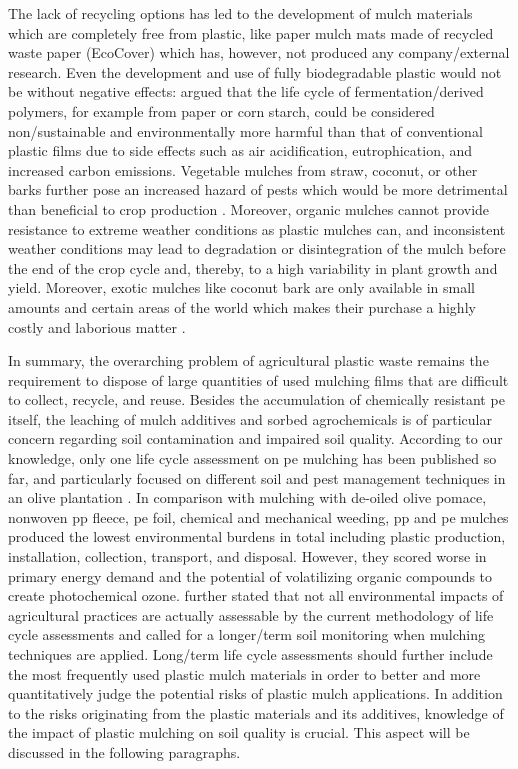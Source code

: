 The lack of recycling options has led to the development of mulch materials which are completely free from plastic, like paper mulch mats made of recycled waste paper (EcoCover) which has, however, not produced any company\-/external research. Even the development and use of fully biodegradable plastic would not be without negative effects: \citet{GerngrossCan1999} argued that the life cycle of fermentation\-/derived polymers, for example from paper or corn starch, could be considered non\-/sustainable and environmentally more harmful than that of conventional plastic films due to side effects such as air acidification, eutrophication, and increased carbon emissions. Vegetable mulches from straw, coconut, or other barks further pose an increased hazard of pests which would be more detrimental than beneficial to crop production \citep{HowardOrganic1998}. Moreover, organic mulches cannot provide resistance to extreme weather conditions as plastic mulches can, and inconsistent weather conditions may lead to degradation or disintegration of the mulch before the end of the crop cycle and, thereby, to a high variability in plant growth and yield. Moreover, exotic mulches like coconut bark are only available in small amounts and certain areas of the world which makes their purchase a highly costly and laborious matter \citep{BriassoulisDegradation2015}.

In summary, the overarching problem of agricultural plastic waste remains the requirement to dispose of large quantities of used mulching films that are difficult to collect, recycle, and reuse. Besides the accumulation of chemically resistant \ac{pe} itself, the leaching of mulch additives and sorbed agrochemicals is of particular concern regarding soil contamination and impaired soil quality. According to our knowledge, only one life cycle assessment on \ac{pe} mulching has been published so far, and particularly focused on different soil and pest management techniques in an olive plantation \citep{RussoEnvironmental2015}.
In comparison with mulching with de-oiled olive pomace, nonwoven \ac{pp} fleece, \ac{pe} foil, chemical and mechanical weeding, \ac{pp} and \ac{pe} mulches produced the lowest environmental burdens in total including plastic production, installation, collection, transport, and disposal. However, they scored worse in primary energy demand and the potential of volatilizing organic compounds to create photochemical ozone.  further stated that not all environmental impacts of agricultural practices are actually assessable by the current methodology of life cycle assessments and called for a longer\-/term soil monitoring when mulching techniques are applied. Long\-/term life cycle assessments should further include the most frequently used plastic mulch materials in order to better and more quantitatively judge the potential risks of plastic mulch applications. In addition to the risks originating from the plastic materials and its additives, knowledge of the impact of plastic mulching on soil quality is crucial. This aspect will be discussed in the following paragraphs.

